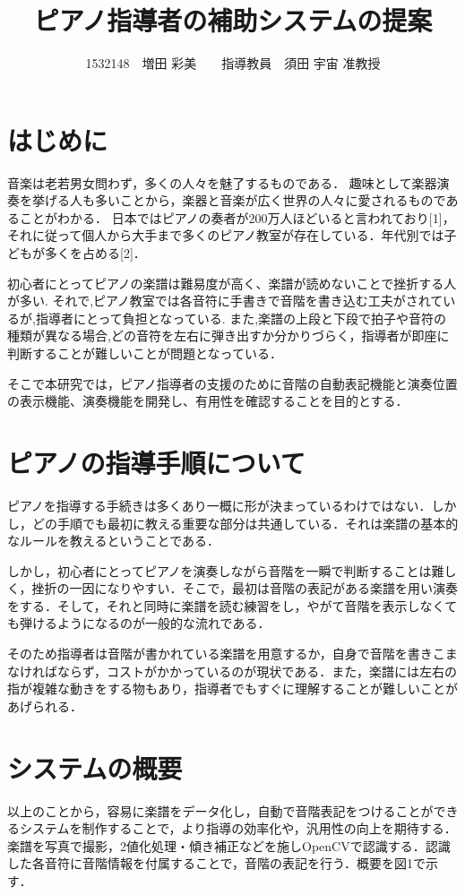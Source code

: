 \documentclass[twocolumn,10pt,a4j]{jsarticle}
\title{ピアノ指導者の補助システムの提案}
\author{1532148　増田 彩美　　指導教員　須田 宇宙 准教授}
\date{}
\begin{document}
\maketitle

\section{はじめに}

音楽は老若男女問わず，多くの人々を魅了するものである．
趣味として楽器演奏を挙げる人も多いことから，楽器と音楽が広く世界の人々に愛されるものであることがわかる．
日本ではピアノの奏者が200万人ほどいると言われており[1]，それに従って個人から大手まで多くのピアノ教室が存在している．年代別では子どもが多くを占める[2]．

初心者にとってピアノの楽譜は難易度が高く、楽譜が読めないことで挫折する人が多い.
それで,ピアノ教室では各音符に手書きで音階を書き込む工夫がされているが,指導者にとって負担となっている.
また,楽譜の上段と下段で拍子や音符の種類が異なる場合,どの音符を左右に弾き出すか分かりづらく，指導者が即座に判断することが難しいことが問題となっている．

そこで本研究では，ピアノ指導者の支援のために音階の自動表記機能と演奏位置の表示機能、演奏機能を開発し、有用性を確認することを目的とする．


\section{ピアノの指導手順について}
ピアノを指導する手続きは多くあり一概に形が決まっているわけではない．しかし，どの手順でも最初に教える重要な部分は共通している．それは楽譜の基本的なルールを教えるということである．

しかし，初心者にとってピアノを演奏しながら音階を一瞬で判断することは難しく，挫折の一因になりやすい．そこで，最初は音階の表記がある楽譜を用い演奏をする．そして，それと同時に楽譜を読む練習をし，やがて音階を表示しなくても弾けるようになるのが一般的な流れである．

そのため指導者は音階が書かれている楽譜を用意するか，自身で音階を書きこまなければならず，コストがかかっているのが現状である．また，楽譜には左右の指が複雑な動きをする物もあり，指導者でもすぐに理解することが難しいことがあげられる．


\section{システムの概要}
以上のことから，容易に楽譜をデータ化し，自動で音階表記をつけることができるシステムを制作することで，より指導の効率化や，汎用性の向上を期待する．
楽譜を写真で撮影，2値化処理・傾き補正などを施しOpenCVで認識する．認識した各音符に音階情報を付属することで，音階の表記を行う．概要を図1で示す．
\end{document}
